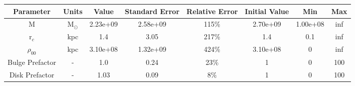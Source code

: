 \begin{tabular}[c]{| c | c | c | c | c | c | c | c |} 
\hline 
    \textbf{Parameter} & \textbf{Units} & \textbf{Value} & \textbf{Standard Error} & \textbf{Relative Error} & \textbf{Initial Value} & \textbf{Min} & \textbf{Max} \\ \hline 
    M & M$_\odot$ & 2.23e+09 & 2.58e+09 & 115\% & 2.70e+09 & 1.00e+08 & inf \\ \hline 
    r$_c$ & kpc & 1.4 & 3.05 & 217\% & 1.4 & 0.1 & inf \\ \hline 
    $\rho_{00}$ & kpc & 3.10e+08 & 1.32e+09 & 424\% & 3.10e+08 & 0 & inf \\ \hline 
    Bulge Prefactor & - & 1.0 & 0.24 & 23\% & 1 & 0 & 100 \\ \hline 
    Disk Prefactor & - & 1.03 & 0.09 & 8\% & 1 & 0 & 100 \\ \hline 
\end{tabular} 

